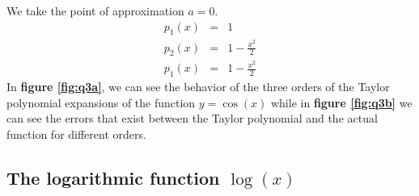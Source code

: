 \documentclass[12,a4paper]{article}
\begin{document}
    We take the point of approximation $a = 0$.
    \begin{eqnarray}
        p_1(x) &=& 1 \nonumber \\
        p_2(x) &=& 1 - \frac{x^2}{2} \nonumber \\
        p_1(x) &=& 1 - \frac{x^2}{2} \nonumber
    \end{eqnarray}
    In \textbf{figure \ref{fig:q3a}}, we can see the behavior of the three orders of the Taylor polynomial expansions of the function $y=\cos(x)$ while in \textbf{figure \ref{fig:q3b}} we can see the errors that exist between the Taylor polynomial and the actual function for different orders.
    \subsection{The logarithmic function $\log(x)$}
\end{document}
